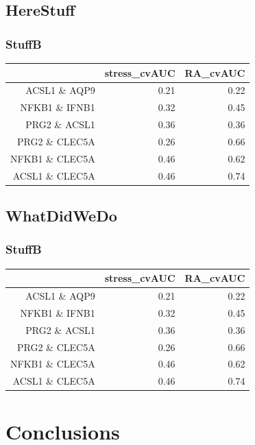 \documentclass{beamer}
\begin{document}
\subsection{HereStuff}

\begin{frame}[fragile]
  	\frametitle{StuffB}
 		\begin{table}[ht]
  		\centering
  		\begin{tabular}{rrr}
   			\hline
   			& stress\_cvAUC & RA\_cvAUC \\ 
   			\hline
  			ACSL1 \& AQP9 & 0.21 & 0.22 \\ 
  			NFKB1 \& IFNB1 & 0.32 & 0.45 \\ 
  			PRG2 \& ACSL1 & 0.36 & 0.36 \\ 
  			PRG2 \& CLEC5A & 0.26 & 0.66 \\ 
  			NFKB1 \& CLEC5A & 0.46 & 0.62 \\ 
  			ACSL1 \& CLEC5A & 0.46 & 0.74 \\ 
   			\hline
		\end{tabular}
		\end{table}
\end{frame}

\subsection{WhatDidWeDo}

\begin{frame}[fragile]
  	\frametitle{StuffB}
 		\begin{table}[ht]
  		\centering
  		\begin{tabular}{rrr}
   			\hline
   			& stress\_cvAUC & RA\_cvAUC \\ 
   			\hline
  			ACSL1 \& AQP9 & 0.21 & 0.22 \\ 
  			NFKB1 \& IFNB1 & 0.32 & 0.45 \\ 
  			PRG2 \& ACSL1 & 0.36 & 0.36 \\ 
  			PRG2 \& CLEC5A & 0.26 & 0.66 \\ 
  			NFKB1 \& CLEC5A & 0.46 & 0.62 \\ 
  			ACSL1 \& CLEC5A & 0.46 & 0.74 \\ 
   			\hline
		\end{tabular}
		\end{table}
\end{frame}

\section{Conclusions}
\end{document}
